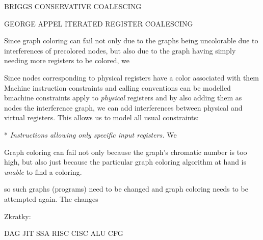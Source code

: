 BRIGGS CONSERVATIVE COALESCING

GEORGE APPEL ITERATED REGISTER COALESCING



Since graph coloring can fail not only due to the graphs being uncolorable due
to interferences of precolored nodes, but also due to the graph having simply
needing more registers to be colored, we 

Since nodes corresponding to physical registers have a color associated with
them
Machine instruction constraints and calling conventions can be modelled bmachine constraints apply to {\em physical}
registers and by also adding them as nodes the interference graph, we can add
interferences between physical and virtual registers. This allows us to model
all usual constraints:

\begitems
* {\em Instructions allowing only specific input registers.} We 
\enditems

Graph coloring can fail not only because the graph's chromatic number is too
high, but also just because the particular graph coloring algorithm at hand is
{\em unable} to find a coloring.

so such
graphs (programs) need to be changed and graph coloring needs to be attempted
again. The changes






Zkratky:

DAG
JIT
SSA
RISC
CISC
ALU
CFG
